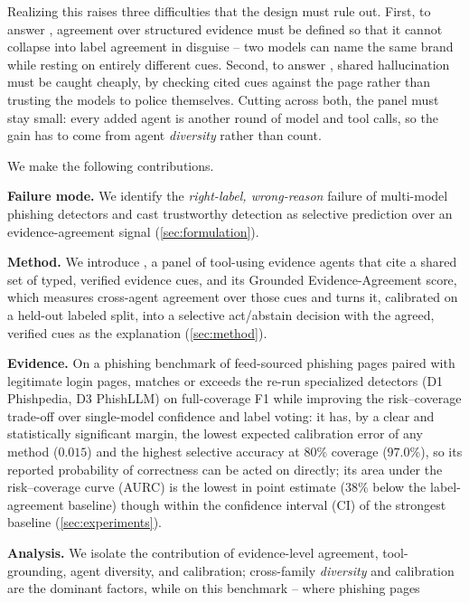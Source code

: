 Realizing this raises three difficulties that the design must rule out. First, to
answer , agreement over structured evidence must be defined so that it
cannot collapse into label agreement in disguise -- two models can name the same
brand while resting on entirely different cues. Second, to answer , shared hallucination must be caught
cheaply, by checking cited cues against the page rather than trusting the models to
police themselves. Cutting across both, the panel must stay small: every added
agent is another round of model and tool calls, so the gain has to come from agent
\emph{diversity} rather than count.

We make the following contributions.
\begin{compactitem}
\item \textbf{Failure mode.} We identify the \emph{right-label, wrong-reason}
failure of multi-model phishing detectors and cast trustworthy detection as
selective prediction over an evidence-agreement signal (\autoref{sec:formulation}).
\item \textbf{Method.} We introduce \toolname{}, a panel of tool-using evidence
agents that cite a shared set of typed, verified evidence cues, and its Grounded
Evidence-Agreement score, which measures cross-agent agreement over those cues and
turns it, calibrated on a held-out labeled split, into a selective act/abstain
decision with the agreed, verified cues as the explanation (\autoref{sec:method}).
\item \textbf{Evidence.} On a phishing benchmark of feed-sourced phishing pages paired
with legitimate login pages, \toolname{} matches or exceeds the re-run specialized
detectors (D1 Phishpedia, D3 PhishLLM) on full-coverage F1 while improving the
risk--coverage trade-off over single-model confidence and label voting:
it has, by a clear and statistically significant margin, the lowest expected calibration
error of any method ($0.015$) and the highest selective accuracy at $80\%$ coverage
($97.0\%$), so its reported probability of correctness can be acted on directly; its area under the risk--coverage curve (AURC) is
the lowest in point estimate ($38\%$ below the label-agreement baseline) though within the
confidence interval (CI) of the strongest baseline (\autoref{sec:experiments}).
\item \textbf{Analysis.} We isolate the contribution of evidence-level agreement,
tool-grounding, agent diversity, and calibration; cross-family \emph{diversity} and
calibration are the dominant factors, while on this benchmark -- where phishing pages

\end{compactitem}
